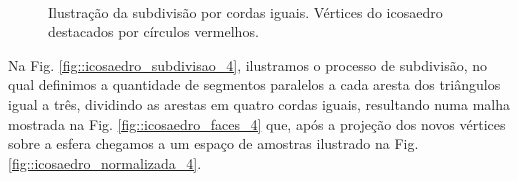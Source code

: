 \documentclass[
    12pt,                %
    oneside,            %
    a4paper,            %
    english,            %
    french,                %
    spanish,            %
    brazil                %
    ]{abntex2}
\begin{document}
\begin{figure}[H]
    \centering
    \\
    \caption{ Ilustração da subdivisão por cordas iguais. Vértices do icosaedro destacados por círculos vermelhos.
    }
    \label{fig::triangle_subdivisao}
\end{figure}


Na Fig. \ref{fig::icosaedro_subdivisao_4}, ilustramos o processo de subdivisão, no qual definimos a quantidade de segmentos paralelos a cada aresta dos triângulos igual a três, dividindo as arestas em quatro cordas iguais, resultando numa malha mostrada na Fig. \ref{fig::icosaedro_faces_4} que, após a projeção dos novos vértices sobre a esfera chegamos a um espaço de amostras ilustrado na Fig. \ref{fig::icosaedro_normalizada_4}.
\end{document}
